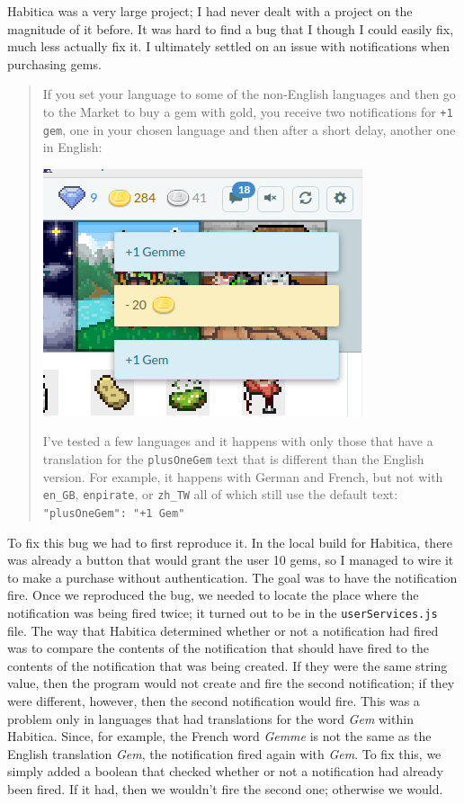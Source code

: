 \documentclass[12pt]{article}
\begin{document}
 

Habitica was a very large project; I had never dealt with a project on the magnitude of it before. It was hard to find a bug that I though I could easily fix, much less actually fix it. I ultimately settled on an issue with notifications when purchasing gems.
\begin{quote}
    If you set your language to some of the non-English languages and then go to the Market to buy a gem with gold, you receive two notifications for \texttt{+1 gem}, one in your chosen language and then after a short delay, another one in English:
    \begin{center}
        \includegraphics[scale=0.4]{issue}
    \end{center}
    I've tested a few languages and it happens with only those that have a translation for the \texttt{plusOneGem} text that is different than the English version. For example, it happens with German and French, but not with \texttt{en\_GB}, \texttt{en\MVAt pirate}, or \texttt{zh\_TW} all of which still use the default text: \texttt{"plusOneGem": "+1 Gem"}
\end{quote}
To fix this bug we had to first reproduce it. In the local build for Habitica, there was already a button that would grant the user 10 gems, so I managed to wire it to make a purchase without authentication. The goal was to have the notification fire. Once we reproduced the bug, we needed to locate the place where the notification was being fired twice; it turned out to be in the \texttt{userServices.js} file. The way that Habitica determined whether or not a notification had fired was to compare the contents of the notification that should have fired to the contents of the notification that was being created. If they were the same string value, then the program would not create and fire the second notification; if they were different, however, then the second notification would fire. This was a problem only in languages that had translations for the word \textit{Gem} within Habitica. Since, for example, the French word \textit{Gemme} is not the same as the English translation \textit{Gem}, the notification fired again with \textit{Gem}. To fix this, we simply added a boolean that checked whether or not a notification had already been fired. If it had, then we wouldn't fire the second one; otherwise we would.
\end{document}
